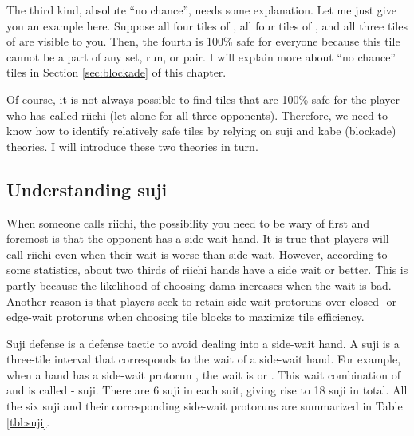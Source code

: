 \bigskip
The third kind, absolute ``no chance'', needs some explanation. Let me just give you an example here. Suppose all four tiles of {\LARGE {}}, all four tiles of {\LARGE {}}, and all three tiles of {\LARGE {}} are visible to you. Then, the fourth {\LARGE {}} is 100\% safe for everyone because this tile cannot be a part of any set, run, or pair. I will explain more about ``no chance'' tiles in Section \ref{sec:blockade} of this chapter.

\bigskip
Of course, it is not always possible to find tiles that are 100\% safe for the player who has called riichi (let alone for all three opponents). Therefore, we need to know how to identify relatively safe tiles by relying on {\jap suji} and {\jap kabe} (blockade) theories. I will introduce these two theories in turn.

\subsection{Understanding {\jap suji}}  \label{sec:suji}

When someone calls riichi, the possibility you need to be wary of first and foremost is that the opponent has a side-wait hand. 
It is true that players will call riichi even when their wait is worse than side wait. However, according to some statistics, about two thirds of riichi hands have a side wait or better. This is partly because the likelihood of choosing {\jap dama} increases when the wait is bad. Another reason is that players seek to retain side-wait protoruns over closed- or edge-wait protoruns when choosing tile blocks to maximize tile efficiency.

\bigskip
{\jap Suji} defense is a defense tactic to avoid dealing into a side-wait hand. A {\jap suji} is a three-tile interval that corresponds to the wait of a side-wait hand. For example, when a hand has a side-wait protorun {\LARGE {}}, the wait is {\LARGE {}} or {\LARGE {}}. This wait combination of {\LARGE{}} and {\LARGE{}} is called {\LARGE{}-} {\jap suji}. There are 6 {\jap suji} in each suit, giving rise to 18 {\jap suji} in total. All the six {\jap suji} and their corresponding side-wait protoruns are summarized in Table \ref{tbl:suji}. 

